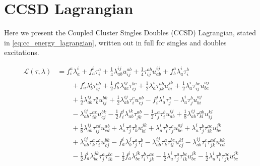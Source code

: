 \section{CCSD Lagrangian}
\label{app:ccsd_lagrangian}

Here we present the Coupled Cluster Singles Doubles (CCSD) Lagrangian,
stated in \autoref{eq:cc_energy_lagrangian}, written out in full 
for singles and doubles excitations.

\begin{equation}
    \begin{aligned}
    \mathscr{L}(\tau, \lambda)
    &=
    f^{a}_{i} \lambda^{i}_{a}
    + f^{i}_{a} \tau^{a}_{i}
    + \frac{1}{4}\lambda^{ij}_{ab} u^{ab}_{ij}
    + \frac{1}{4}\tau^{ab}_{ij} u^{ij}_{ab}
    + f^{a}_{b} \lambda^{i}_{a} \tau^{b}_{i}
    \\
    &\qquad
    + f^{i}_{a} \lambda^{j}_{b} \tau^{ab}_{ij}
    + \frac{1}{2}f^{a}_{b} \lambda^{ij}_{ac} \tau^{bc}_{ij}
    + \frac{1}{2}\lambda^{i}_{a} \tau^{ab}_{jk} u^{jk}_{bi}
    + \frac{1}{2}\lambda^{i}_{a} \tau^{bc}_{ij} u^{aj}_{bc}
    \\
    &\qquad
    + \frac{1}{2}\lambda^{ij}_{ab} \tau^{a}_{k} u^{bk}_{ij}
    + \frac{1}{2}\lambda^{ij}_{ab} \tau^{c}_{i} u^{ab}_{cj}
    - f^{j}_{i} \lambda^{i}_{a} \tau^{a}_{j}
    - \lambda^{i}_{a} \tau^{b}_{j} u^{aj}_{bi}
    \\
    &\qquad
    - \lambda^{ij}_{ab} \tau^{ac}_{ik} u^{bk}_{cj}
    - \frac{1}{2}f^{j}_{i} \lambda^{ik}_{ab} \tau^{ab}_{jk}
    - \frac{1}{2}\tau^{a}_{j} \tau^{b}_{i} u^{ij}_{ab}
    + \frac{1}{8}\lambda^{ij}_{ab} \tau^{ab}_{kl} u^{kl}_{ij}
    \\
    &\qquad
    + \frac{1}{8}\lambda^{ij}_{ab} \tau^{cd}_{ij} u^{ab}_{cd}
    + \lambda^{i}_{a} \tau^{a}_{j} \tau^{b}_{k} u^{jk}_{bi}
    + \lambda^{i}_{a} \tau^{b}_{i} \tau^{c}_{j} u^{aj}_{bc}
    + \lambda^{i}_{a} \tau^{b}_{j} \tau^{ac}_{ik} u^{jk}_{bc}
    \\
    &\qquad
    + \lambda^{ij}_{ab} \tau^{a}_{k} \tau^{c}_{i} u^{bk}_{cj}
    - f^{i}_{a} \lambda^{j}_{b} \tau^{a}_{j} \tau^{b}_{i}
    - \lambda^{ij}_{ab} \tau^{a}_{k} \tau^{bc}_{il} u^{kl}_{cj}
    - \lambda^{ij}_{ab} \tau^{c}_{i} \tau^{ad}_{jk} u^{bk}_{cd}
    \\
    &\qquad
    - \frac{1}{2}f^{i}_{a} \lambda^{jk}_{bc} \tau^{a}_{j} \tau^{bc}_{ik}
    - \frac{1}{2}f^{i}_{a} \lambda^{jk}_{bc} \tau^{b}_{i} \tau^{ac}_{jk}
    - \frac{1}{2}\lambda^{i}_{a} \tau^{a}_{j} \tau^{bc}_{ik} u^{jk}_{bc}
    - \frac{1}{2}\lambda^{i}_{a} \tau^{b}_{i} \tau^{ac}_{jk} u^{jk}_{bc}

\end{aligned}
\end{equation}
